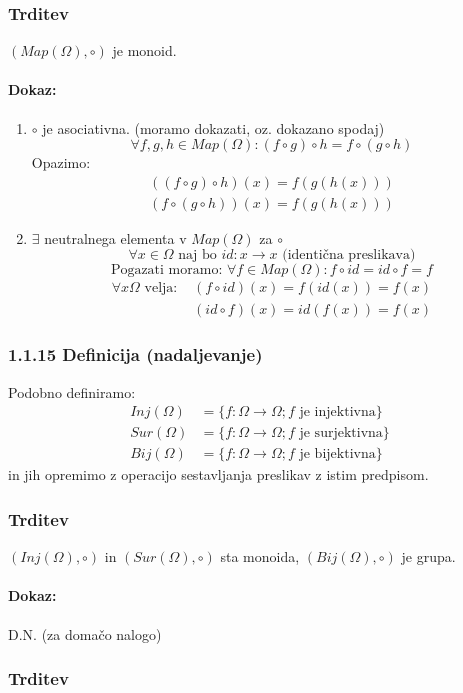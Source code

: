 \subsubsection{Trditev}
$(Map(\Omega), \circ)$ je monoid.

\paragraph{Dokaz:}
\begin{enumerate}[label=\Roman*)]
    \item $\circ$ je asociativna. (moramo dokazati, oz. dokazano spodaj) 
    $$
    \forall f, g, h \in Map(\Omega) : (f \circ g) \circ h = f \circ (g \circ h)
    $$
    Opazimo:
    \begin{align*}
        ((f \circ g) \circ h)(x) = f(g(h(x))) \\
        (f\circ (g \circ h))(x) = f(g(h(x)))
    \end{align*}
    \item $\exists$ neutralnega elementa v $Map(\Omega)$ za $\circ$
    $$
    \forall x \in \Omega \text{ naj bo } id : x \to x \text{ (identična preslikava)}
    $$
    $$
    \text{Pogazati moramo: } \forall f \in Map(\Omega): f \circ id = id \circ f = f
    $$
    \begin{align*}
        \forall x \Omega \text{ velja: } & (f \circ id)(x) = f(id(x)) = f(x) \\
        & (id \circ f)(x) = id(f(x)) = f(x)
    \end{align*}
\end{enumerate}

\subsubsection*{1.1.15 \space \space Definicija (nadaljevanje)}
Podobno definiramo:
\begin{align*}
    Inj(\Omega) &= \{ f: \Omega \to \Omega ; f \text{ je injektivna}\} \\
    Sur(\Omega) &= \{ f: \Omega \to \Omega ; f \text{ je surjektivna} \} \\
    Bij(\Omega) &= \{ f: \Omega \to \Omega ; f \text{ je bijektivna} \}       
\end{align*}
in jih opremimo z operacijo sestavljanja preslikav z istim predpisom.

\subsubsection{Trditev}
$(Inj(\Omega), \circ)$ in $(Sur(\Omega), \circ)$ sta monoida, $(Bij(\Omega), \circ)$ je grupa.
\paragraph{Dokaz:} D.N. (za domačo nalogo)

\subsubsection{Trditev}








